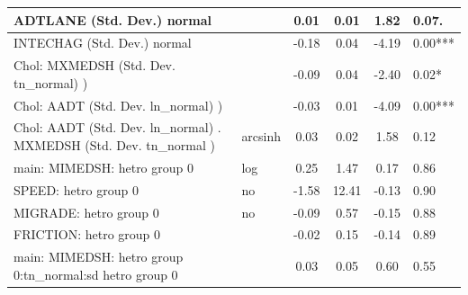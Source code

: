 \begin{table}
\begin{center}
\begin{tabular}{|l|l|c|c|c|l|}
			\hline
			ADTLANE (Std. Dev.) normal &  & 0.01 & 0.01 & 1.82 & 0.07. \\
			\hline
			INTECHAG (Std. Dev.) normal &  & -0.18 & 0.04 & -4.19 & 0.00*** \\
			\hline
			 Chol: MXMEDSH (Std. Dev. tn_normal) ) &  & -0.09 & 0.04 & -2.40 & 0.02* \\
			\hline
			 Chol: AADT (Std. Dev. ln_normal) ) &  & -0.03 & 0.01 & -4.09 & 0.00*** \\
			\hline
			 Chol: AADT (Std. Dev. ln_normal) . MXMEDSH (Std. Dev.   tn_normal ) & arcsinh & 0.03 & 0.02 & 1.58 & 0.12 \\
			\hline
			main: MIMEDSH: hetro group 0 & log & 0.25 & 1.47 & 0.17 & 0.86 \\
			\hline
			SPEED: hetro group 0 & no & -1.58 & 12.41 & -0.13 & 0.90 \\
			\hline
			MIGRADE: hetro group 0 & no & -0.09 & 0.57 & -0.15 & 0.88 \\
			\hline
			FRICTION: hetro group 0 &  & -0.02 & 0.15 & -0.14 & 0.89 \\
			\hline
			main: MIMEDSH: hetro group 0:tn_normal:sd  hetro group 0 &  & 0.03 & 0.05 & 0.60 & 0.55 \\
			\hline
		\end{tabular}
	\end{center}
\end{table}